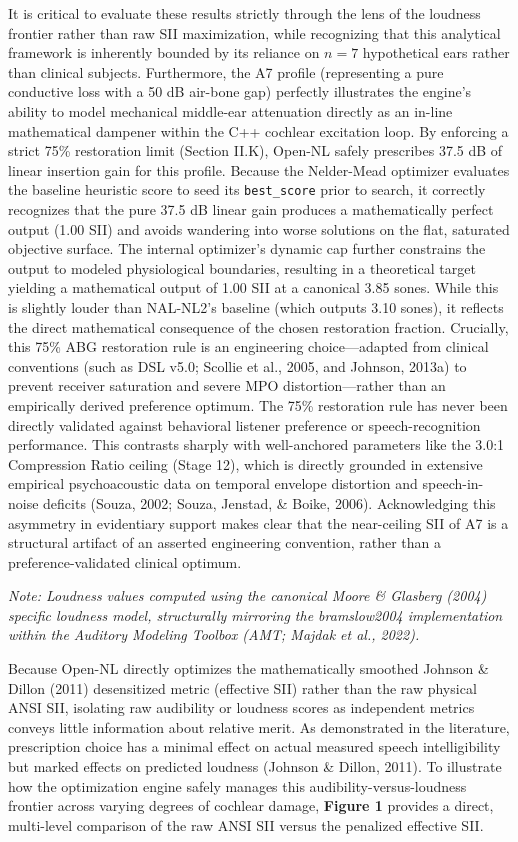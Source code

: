 \documentclass[
  12pt,
]{article}
\begin{document}
It is critical to evaluate these results strictly through the lens of
the loudness frontier rather than raw SII maximization, while
recognizing that this analytical framework is inherently bounded by its
reliance on \(n=7\) hypothetical ears rather than clinical subjects.
Furthermore, the A7 profile (representing a pure conductive loss with a
50 dB air-bone gap) perfectly illustrates the engine's ability to model
mechanical middle-ear attenuation directly as an in-line mathematical
dampener within the C++ cochlear excitation loop. By enforcing a strict
75\% restoration limit (Section II.K), Open-NL safely prescribes 37.5 dB
of linear insertion gain for this profile. Because the Nelder-Mead
optimizer evaluates the baseline heuristic score to seed its
\texttt{best\_score} prior to search, it correctly recognizes that the
pure 37.5 dB linear gain produces a mathematically perfect output (1.00
SII) and avoids wandering into worse solutions on the flat, saturated
objective surface. The internal optimizer's dynamic cap further
constrains the output to modeled physiological boundaries, resulting in
a theoretical target yielding a mathematical output of 1.00 SII at a
canonical 3.85 sones. While this is slightly louder than NAL-NL2's
baseline (which outputs 3.10 sones), it reflects the direct mathematical
consequence of the chosen restoration fraction. Crucially, this 75\% ABG
restoration rule is an engineering choice---adapted from clinical
conventions (such as DSL v5.0; Scollie et al., 2005, and Johnson, 2013a)
to prevent receiver saturation and severe MPO distortion---rather than
an empirically derived preference optimum. The 75\% restoration rule has
never been directly validated against behavioral listener preference or
speech-recognition performance. This contrasts sharply with
well-anchored parameters like the 3.0:1 Compression Ratio ceiling (Stage
12), which is directly grounded in extensive empirical psychoacoustic
data on temporal envelope distortion and speech-in-noise deficits
(Souza, 2002; Souza, Jenstad, \& Boike, 2006). Acknowledging this
asymmetry in evidentiary support makes clear that the near-ceiling SII
of A7 is a structural artifact of an asserted engineering convention,
rather than a preference-validated clinical optimum.

\emph{Note: Loudness values computed using the canonical Moore \&
Glasberg (2004) specific loudness model, structurally mirroring the
bramslow2004 implementation within the Auditory Modeling Toolbox (AMT;
Majdak et al., 2022).}

Because Open-NL directly optimizes the mathematically smoothed Johnson
\& Dillon (2011) desensitized metric (effective SII) rather than the raw
physical ANSI SII, isolating raw audibility or loudness scores as
independent metrics conveys little information about relative merit. As
demonstrated in the literature, prescription choice has a minimal effect
on actual measured speech intelligibility but marked effects on
predicted loudness (Johnson \& Dillon, 2011). To illustrate how the
optimization engine safely manages this audibility-versus-loudness
frontier across varying degrees of cochlear damage, \textbf{Figure 1}
provides a direct, multi-level comparison of the raw ANSI SII versus the
penalized effective SII.
\end{document}
